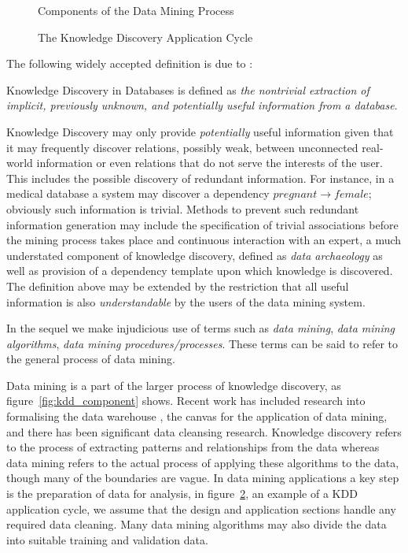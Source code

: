  
\begin{figure}
\centerline{}
\caption{\label{fig:dm_process}Components of the Data
Mining Process}
\end{figure}
  
 
\begin{figure}
\centerline{}
\caption{\label{fig:kd_process}The Knowledge Discovery
Application Cycle}
\end{figure}

The following widely accepted definition is due to \cite{kdd96}:

\begin{definition}
\begin{rm} Knowledge Discovery in Databases is defined as {\em the nontrivial extraction of implicit, previously unknown, and potentially useful information from a database}.   
\end{rm}
\end{definition}

Knowledge Discovery may only provide {\em potentially} useful
information given that it may frequently discover relations, possibly
weak, between unconnected real-world information or even relations
that do not serve the interests of the user.  This includes the
possible discovery of redundant information. For instance, in a
medical database a system may discover a dependency $pregnant
\rightarrow female$; obviously such information is trivial.  Methods
to prevent such redundant information generation may include the
specification of trivial associations before the mining process takes
place and continuous interaction with an expert, a much understated
component of knowledge discovery, defined as {\em data
archaeology} as well as provision of a dependency template upon which
knowledge is discovered. The definition above may be extended by the restriction
that all useful information is also {\em understandable} by the users
of the data mining system. 

\medskip
In the sequel we make injudicious use of terms such as {\em data
mining}, {\em data mining algorithms}, {\em data mining
procedures/processes}. These terms can be said to refer to the general
process of data mining. 

\medskip

Data mining is a part of the larger process of knowledge discovery, as
figure~\ref{fig:kdd_component} shows. Recent work has included
research into formalising the data warehouse \cite{hgmw95,inm96a}, the canvas for
the application of data mining, and there has been significant
data cleansing research.  Knowledge
discovery refers to the process of extracting patterns and relationships 
from the data whereas data mining refers to the actual process of applying
these algorithms to the data, though many of the boundaries are vague.
In data mining applications a key step is 
the preparation of data for analysis, in figure~\ref{fig:kd_process},
an example of a KDD application cycle, we assume that the
design and application sections handle any required data
cleaning. Many data mining algorithms may also divide the data into suitable training and validation data.

